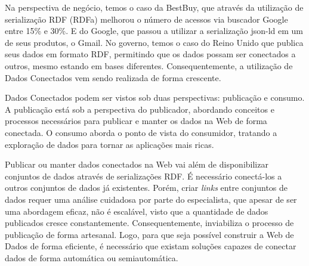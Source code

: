 Na perspectiva de negócio, temos o caso da BestBuy, que através da utilização de serialização RDF (RDFa) melhorou o número de acessos via buscador  Google entre 15\% e 30\%. E do Google, que passou a utilizar a serialização json-ld em um de seus produtos, o Gmail. No governo, temos o caso do Reino Unido que publica seus dados em formato RDF, permitindo que os dados possam ser conectados a outros, mesmo estando em bases diferentes. Consequentemente, a utilização de Dados Conectados vem sendo realizada de forma crescente.
% 
% 
% 
% 
% 
% 
% 
% 
% 
% 
% 
% 

Dados Conectados podem ser vistos sob duas perspectivas: publicação e consumo. A publicação está sob a perspectiva do publicador, abordando conceitos \cite{berners2006linked, wood2014linked} e processos \cite{bizer2007publish, hyland2011joy, villazon2011methodological, Avila2015} necessários para publicar e manter os dados na Web de forma conectada. O consumo aborda o ponto de vista do consumidor, tratando a exploração de dados para tornar as aplicações mais ricas. 

Publicar ou manter dados conectados na Web vai além de disponibilizar conjuntos de dados através de serializações RDF. É necessário conectá-los a outros conjuntos de dados já existentes. Porém, criar \textit{links} entre conjuntos de dados requer uma análise cuidadosa por parte do especialista, que apesar de ser uma abordagem eficaz, não é escalável, visto que a quantidade de dados publicados cresce constantemente. Consequentemente, inviabiliza o processo de publicação de forma artesanal. Logo, para que seja possível construir a Web de Dados de forma eficiente, é necessário que existam soluções capazes de conectar dados de forma automática ou semiautomática.

